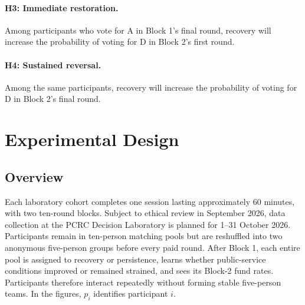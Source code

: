 \documentclass[11pt,a4paper]{article}
\newcommand{\Dproc}{\textsf{D}}
\newcommand{\Aproc}{\textsf{A}}
\begin{document}
\paragraph{H3: Immediate restoration.} Among participants who vote for \Aproc{} in Block 1's final round, recovery will increase the probability of voting for \Dproc{} in Block 2's first round.

\paragraph{H4: Sustained reversal.} Among the same participants, recovery will increase the probability of voting for \Dproc{} in Block 2's final round.

\section{Experimental Design}

\subsection{Overview}

Each laboratory cohort completes one session lasting approximately 60 minutes, with two ten-round blocks. Subject to ethical review in September 2026, data collection at the PCRC Decision Laboratory is planned for 1--31 October 2026. Participants remain in ten-person matching pools but are reshuffled into two anonymous five-person groups before every paid round. After Block 1, each entire pool is assigned to recovery or persistence, learns whether public-service conditions improved or remained strained, and sees its Block-2 fund rates. Participants therefore interact repeatedly without forming stable five-person teams. In the figures, \(p_i\) identifies participant \(i\).
\end{document}

